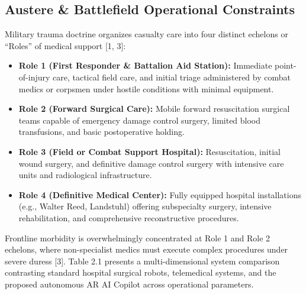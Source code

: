 \documentclass[12pt,a4paper]{report}
\begin{document}
\subsection{Austere \& Battlefield Operational Constraints}
Military trauma doctrine organizes casualty care into four distinct echelons or ``Roles'' of medical support [1, 3]:
\begin{itemize}\setlength{\itemsep}{0.4em}
    \item \textbf{Role 1 (First Responder \& Battalion Aid Station):} Immediate point-of-injury care, tactical field care, and initial triage administered by combat medics or corpsmen under hostile conditions with minimal equipment.
    \item \textbf{Role 2 (Forward Surgical Care):} Mobile forward resuscitation surgical teams capable of emergency damage control surgery, limited blood transfusions, and basic postoperative holding.
    \item \textbf{Role 3 (Field or Combat Support Hospital):} Resuscitation, initial wound surgery, and definitive damage control surgery with intensive care units and radiological infrastructure.
    \item \textbf{Role 4 (Definitive Medical Center):} Fully equipped hospital installations (e.g., Walter Reed, Landstuhl) offering subspecialty surgery, intensive rehabilitation, and comprehensive reconstructive procedures.
\end{itemize}

Frontline morbidity is overwhelmingly concentrated at Role 1 and Role 2 echelons, where non-specialist medics must execute complex procedures under severe duress [3]. Table 2.1 presents a multi-dimensional system comparison contrasting standard hospital surgical robots, telemedical systems, and the proposed autonomous AR AI Copilot across operational parameters.
\end{document}
